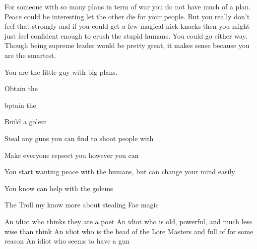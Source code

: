 \documentclass[char]{guildcamp2}
\begin{document}
For someone with so many plans in term of war you do not have much of a plan. Peace could be interesting let the other die for your people. But you really don't feel that strongly and if you could get a few magical nick-knacks then you might just feel confident enough to crush the stupid humans. You could go either way. Though being supreme leader would be pretty great, it makes sense because you are the smartest.

You are the little guy with big plans.

\begin{itemz}[Goals]
  \item Obtain the \iOrbofPower{}
  \item bptain the \iTearofMagic{}
  \item Build a golem
	\item Steal any guns you can find to shoot people with
	\item Make everyone repsect you however you can
\end{itemz}

\begin{itemz}[Notes]
  \item You start wanting peace with the humans, but can change your mind easily 
  \item You know \cOnyx{} can help with the golems
	\item The Troll my know more about stealing Fae magic
\end{itemz}


\begin{contacts}
  \contact{\cTroll{}} An idiot who thinks they are a poet
  \contact{\cOnyx{}} An idiot who is old, powerful, and much less wise than \cOnyx{\they} think
	\contact{\cVampire{}} An idiot who is the head of the Lore Masters and full of \cVampire{\themself} for some reason
	\contact{\cCleric{}} An idiot who seems to have a gun
\end{contacts}
\end{document}
